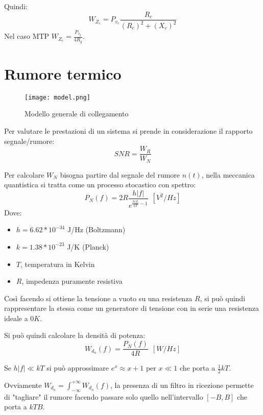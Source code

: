 \documentclass{article}
\begin{document}
\noindent Quindi:
$$W_{Z_c}=P_{v_c}\frac{R_c}{(R_c)^2+(X_c)^2}$$
\noindent Nel caso MTP $\displaystyle W_{Z_c}=\frac{P_{v_g}}{4R_g}$.

\newpage

\section{Rumore termico}

\begin{figure}[ht]
    \centering
    \texttt{[image: model.png]}
    \caption{Modello generale di collegamento}
\end{figure}

\noindent Per valutare le prestazioni di un sistema si prende in considerazione il rapporto segnale/rumore:
$$SNR=\frac{W_R}{W_N}$$\newline

\noindent Per calcolare $W_N$ bisogna partire dal segnale del rumore $n(t)$, nella meccanica quantistica si tratta come un processo stocastico con spettro:
$$ P_N(f)=2R\frac{ h|f|}{e^{\displaystyle \frac{h|f|}{kT}-1}}\ \ [V^2/Hz]$$
\noindent Dove:
\begin{itemize}
    \item $h=6.62*10^{-34}$ J/Hz (Boltzmann)
    \item $k=1.38*10^{-23}$ J/K (Planck)
    \item $T$, temperatura in Kelvin
    \item $R$, impedenza puramente resistiva\newline
\end{itemize}

\noindent Così facendo si ottiene la tensione a vuoto su una resistenza $R$, si può quindi rappresentare la stessa come un generatore di tensione con in serie una resistenza ideale a $0K$.\newline

\noindent Si può quindi calcolare la densità di potenza:
$$W_{d_n}(f)=\frac{P_N(f)}{4R}\ \ [W/Hz]$$

\noindent Se $h|f|\ll kT$ si può approssimare $e^x\approx x+1$ per $x\ll 1$ che porta a $\frac{1}{2}kT$.\newline

\noindent Ovviamente $W_{d_n}=\int_{-\infty}^{+\infty}W_{d_n}(f)$, la presenza di un filtro in ricezione permette di "tagliare" il rumore facendo passare solo quello nell'intervallo $[-B,B]$ che porta a $kTB$.\newline
\end{document}
